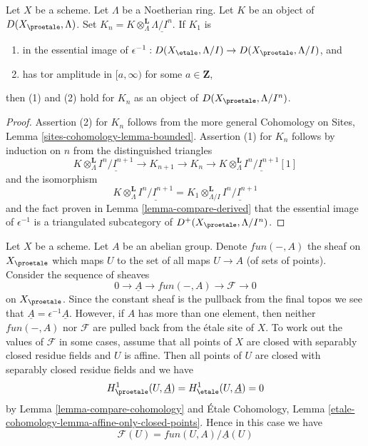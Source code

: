 \begin{lemma}
\label{lemma-compare-truncations}
Let $X$ be a scheme. Let $\Lambda$ be a Noetherian ring.
Let $K$ be an object of $D(X_\proetale, \Lambda)$.
Set $K_n = K \otimes_\Lambda^\mathbf{L} \underline{\Lambda/I^n}$.
If $K_1$ is
\begin{enumerate}
\item in the essential image of
$\epsilon^{-1} :D(X_\etale, \Lambda/I) \to D(X_\proetale, \Lambda/I)$, and
\item has tor amplitude in $[a,\infty)$ for some $a \in \mathbf{Z}$,
\end{enumerate}
then (1) and (2) hold for $K_n$ as an object of $D(X_\proetale, \Lambda/I^n)$.
\end{lemma}

\begin{proof}
Assertion (2) for $K_n$ follows from the more general
Cohomology on Sites, Lemma \ref{sites-cohomology-lemma-bounded}.
Assertion (1) for $K_n$ follows by induction on $n$ from the
distinguished triangles
$$
K \otimes_\Lambda^\mathbf{L} \underline{I^n/I^{n + 1}} \to
K_{n + 1} \to
K_n \to
K \otimes_\Lambda^\mathbf{L} \underline{I^n/I^{n + 1}}[1]
$$
and the isomorphism
$$
K \otimes_\Lambda^\mathbf{L} \underline{I^n/I^{n + 1}} =
K_1 \otimes_{\Lambda/I}^\mathbf{L} \underline{I^n/I^{n + 1}}
$$
and the fact proven in Lemma \ref{lemma-compare-derived}
that the essential image of $\epsilon^{-1}$ is a triangulated
subcategory of $D^+(X_\proetale, \Lambda/I^n)$.
\end{proof}

\begin{example}
\label{example-functions-mod-locally-constant-functions}
Let $X$ be a scheme. Let $A$ be an abelian group. Denote
$fun(-, A)$ the sheaf on $X_\proetale$ which maps $U$
to the set of all maps $U \to A$ (of sets of points).
Consider the sequence of sheaves
$$
0 \to \underline{A} \to fun(-, A) \to \mathcal{F} \to 0
$$
on $X_\proetale$. Since the constant sheaf is the pullback from the final
topos we see that $\underline{A} = \epsilon^{-1}\underline{A}$.
However, if $A$ has more than one element, then neither $fun(-, A)$
nor $\mathcal{F}$ are pulled back from the \'etale site of $X$.
To work out the values of $\mathcal{F}$ in some cases, assume that
all points of $X$ are closed with separably closed residue fields
and $U$ is affine. Then all points of $U$ are closed with separably
closed residue fields and we have
$$
H^1_\proetale(U, \underline{A}) =
H^1_\etale(U, \underline{A}) = 0
$$
by Lemma \ref{lemma-compare-cohomology} and
\'Etale Cohomology, Lemma
\ref{etale-cohomology-lemma-affine-only-closed-points}.
Hence in this case we have
$$
\mathcal{F}(U) = fun(U, A)/\underline{A}(U)
$$
\end{example}





